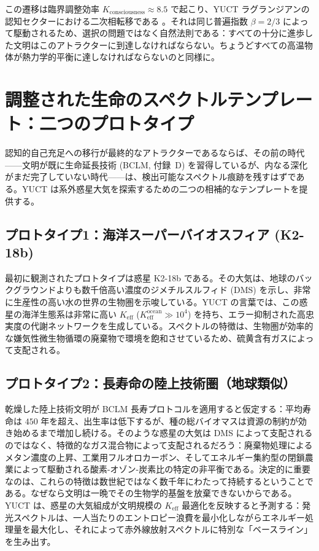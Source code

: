 \documentclass[11pt,a4paper]{article}
\begin{document}
	この遷移は臨界調整効率 \(K_{\mathrm{consciousness}}\approx 8.5\) で起こり、YUCT ラグランジアンの認知セクターにおける二次相転移である \citep{AppH}。それは同じ普遍指数 \(\beta=2/3\) によって駆動されるため、選択の問題ではなく自然法則である：すべての十分に進歩した文明はこのアトラクターに到達しなければならない。ちょうどすべての高温物体が熱力学的平衡に達しなければならないのと同様に。
	
	\section{調整された生命のスペクトルテンプレート：二つのプロトタイプ}
	\label{sec:spectra}
	
	認知的自己充足への移行が最終的なアトラクターであるならば、その前の時代——文明が既に生命延長技術 (BCLM, 付録~D) を習得しているが、内なる深化がまだ完了していない時代——は、検出可能なスペクトル痕跡を残すはずである。YUCT は系外惑星大気を探索するための二つの相補的なテンプレートを提供する。
	
	\subsection{プロトタイプ1：海洋スーパーバイオスフィア (K2-18b)}
	最初に観測されたプロトタイプは惑星 K2-18b である。その大気は、地球のバックグラウンドよりも数千倍高い濃度のジメチルスルフィド (DMS) を示し、非常に生産性の高い水の世界の生物圏を示唆している。YUCT の言葉では、この惑星の海洋生態系は非常に高い \(K_{\mathrm{eff}}\) (\(K_{\mathrm{eff}}^{\mathrm{ocean}} \gg 10^4\)) を持ち、エラー抑制された高忠実度の代謝ネットワークを生成している。スペクトルの特徴は、生物圏が効率的な嫌気性微生物循環の廃棄物で環境を飽和させているため、硫黄含有ガスによって支配される。
	
	\subsection{プロトタイプ2：長寿命の陸上技術圏（地球類似）}
	乾燥した陸上技術文明が BCLM 長寿プロトコルを適用すると仮定する：平均寿命は \(450\) 年を超え、出生率は低下するが、種の総バイオマスは資源の制約が効き始めるまで増加し続ける。そのような惑星の大気は DMS によって支配されるのではなく、特徴的なガス混合物によって支配されるだろう：廃棄物処理によるメタン濃度の上昇、工業用フルオロカーボン、そしてエネルギー集約型の閉鎖農業によって駆動される酸素-オゾン-炭素比の特定の非平衡である。決定的に重要なのは、これらの特徴は数世紀ではなく数千年にわたって持続するということである。なぜなら文明は一晩でその生物学的基盤を放棄できないからである。YUCT は、惑星の大気組成が文明規模の \(K_{\mathrm{eff}}\) 最適化を反映すると予測する：発光スペクトルは、一人当たりのエントロピー浪費を最小化しながらエネルギー処理量を最大化し、それによって赤外線放射スペクトルに特別な「ベースライン」を生み出す。
	
\end{document}
